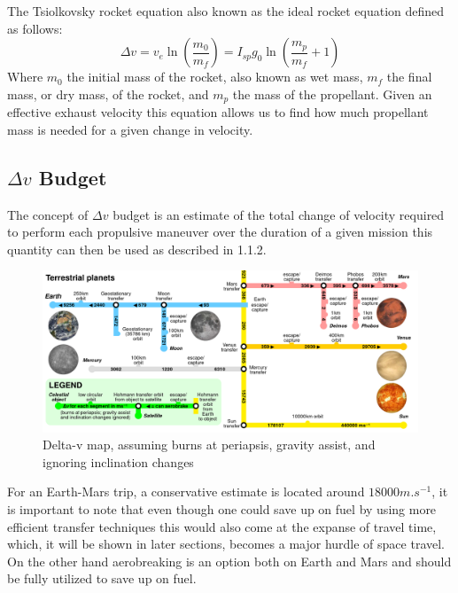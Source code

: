 \documentclass[12pt,a4paper]{report}
\begin{document}
The Tsiolkovsky rocket equation also known as the ideal rocket equation defined as follows: 
\begin{equation}
\Delta v=v_e\ln\left(\frac{m_0}{m_f}\right)=I_{sp}g_0\ln\left(\frac{m_p}{m_f}+1\right)
\end{equation}
Where $m_0$ the initial mass of the rocket, also known as wet mass, $m_f$ the final mass, or dry mass, of the rocket, and $m_p$ the mass of the propellant.
Given an effective exhaust velocity this equation allows us to find how much propellant mass is needed for a given change in velocity.
\subsection{$\Delta v$ Budget}
The concept of $\Delta v$ budget is an estimate of the total change of velocity required to perform each propulsive maneuver over the duration of a given mission this quantity can then be used as described in 1.1.2.\\
\begin{figure}[hbtp]
\centering
\includegraphics[scale=.2]{img/dv.png}
\caption{Delta-v map, assuming burns at periapsis, gravity assist, and ignoring inclination changes}
\end{figure}

For an Earth-Mars trip, a conservative estimate is located around $18000m.s^{-1}$, it is important to note that even though one could save up on fuel by using more efficient transfer techniques this would also come at the expanse of travel time, which, it will be shown in later sections, becomes a major hurdle of space travel. On the other hand aerobreaking is an option both on Earth and Mars and should be fully utilized to save up on fuel.
\newpage
\end{document}
